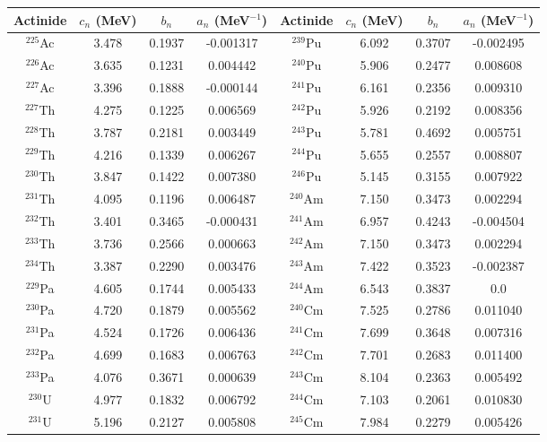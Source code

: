 \begin{table}[ht]
\footnotesize
\begin{center}
\begin{tabular}{|c|c|c|c||c|c|c|c|} \hline
Actinide & $c_{n}$ (MeV) & $b_{n}$ & $a_{n}$ (MeV$^{-1}$) & Actinide & $c_{n}$ (MeV) & $b_{n}$ & $a_{n}$ (MeV$^{-1}$) \\ \hline
$^{225}$Ac & 3.478 & 0.1937 & -0.001317 & $^{239}$Pu & 6.092 & 0.3707 & -0.002495 \\ 
$^{226}$Ac & 3.635 & 0.1231 & 0.004442 & $^{240}$Pu & 5.906 & 0.2477 & 0.008608 \\ 
$^{227}$Ac & 3.396 & 0.1888 & -0.000144 & $^{241}$Pu & 6.161 & 0.2356 & 0.009310 \\ 
$^{227}$Th & 4.275 & 0.1225 & 0.006569 & $^{242}$Pu & 5.926 & 0.2192 & 0.008356 \\ 
$^{228}$Th & 3.787 & 0.2181 & 0.003449 & $^{243}$Pu & 5.781 & 0.4692 & 0.005751 \\ 
$^{229}$Th & 4.216 & 0.1339 & 0.006267 & $^{244}$Pu & 5.655 & 0.2557 & 0.008807 \\ 
$^{230}$Th & 3.847 & 0.1422 & 0.007380 & $^{246}$Pu & 5.145 & 0.3155 & 0.007922 \\ 
$^{231}$Th & 4.095 & 0.1196 & 0.006487 & $^{240}$Am & 7.150 & 0.3473 & 0.002294 \\ 
$^{232}$Th & 3.401 & 0.3465 & -0.000431 & $^{241}$Am & 6.957 & 0.4243 & -0.004504 \\ 
$^{233}$Th & 3.736 & 0.2566 & 0.000663 & $^{242}$Am & 7.150 & 0.3473 & 0.002294 \\ 
$^{234}$Th & 3.387 & 0.2290 & 0.003476 & $^{243}$Am & 7.422 & 0.3523 & -0.002387 \\ 
$^{229}$Pa & 4.605 & 0.1744 & 0.005433 & $^{244}$Am & 6.543 & 0.3837 & 0.0 \\ 
$^{230}$Pa & 4.720 & 0.1879 & 0.005562 & $^{240}$Cm & 7.525 & 0.2786 & 0.011040 \\ 
$^{231}$Pa & 4.524 & 0.1726 & 0.006436 & $^{241}$Cm & 7.699 & 0.3648 & 0.007316 \\ 
$^{232}$Pa & 4.699 & 0.1683 & 0.006763 & $^{242}$Cm & 7.701 & 0.2683 & 0.011400 \\ 
$^{233}$Pa & 4.076 & 0.3671 & 0.000639 & $^{243}$Cm & 8.104 & 0.2363 & 0.005492 \\ 
$^{230}$U & 4.977 & 0.1832 & 0.006792 & $^{244}$Cm & 7.103 & 0.2061 & 0.010830 \\ 
$^{231}$U & 5.196 & 0.2127 & 0.005808 & $^{245}$Cm & 7.984 & 0.2279 & 0.005426 \\ 

\end{tabular}
\end{center}
\end{table}
